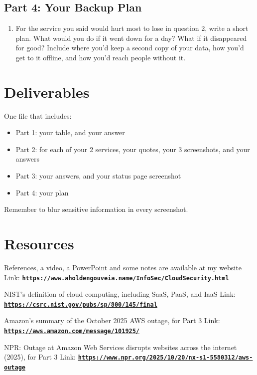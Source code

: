 \documentclass[12pt]{article}
\begin{document}
\subsection*{Part 4: Your Backup Plan}
\begin{enumerate}[start=13]
    \item For the service you said would hurt most to lose in question 2, write a short plan. What would you do if it went down for a day? What if it disappeared for good? Include where you'd keep a second copy of your data, how you'd get to it offline, and how you'd reach people without it.
\end{enumerate}

\section*{Deliverables}
One file that includes:
\begin{itemize}
    \item Part 1: your table, and your answer
    \item Part 2: for each of your 2 services, your quotes, your 3 screenshots, and your answers
    \item Part 3: your answers, and your status page screenshot
    \item Part 4: your plan
\end{itemize}
Remember to blur sensitive information in every screenshot.

\section*{Resources}
References, a video, a PowerPoint and some notes are available at my website
Link: \href{https://www.aholdengouveia.name/InfoSec/CloudSecurity.html}{\textbf{\nolinkurl{https://www.aholdengouveia.name/InfoSec/CloudSecurity.html}}}

NIST's definition of cloud computing, including SaaS, PaaS, and IaaS
Link: \href{https://csrc.nist.gov/pubs/sp/800/145/final}{\textbf{\nolinkurl{https://csrc.nist.gov/pubs/sp/800/145/final}}}

Amazon's summary of the October 2025 AWS outage, for Part 3
Link: \href{https://aws.amazon.com/message/101925/}{\textbf{\nolinkurl{https://aws.amazon.com/message/101925/}}}

NPR: Outage at Amazon Web Services disrupts websites across the internet (2025), for Part 3
Link: \href{https://www.npr.org/2025/10/20/nx-s1-5580312/aws-outage}{\textbf{\nolinkurl{https://www.npr.org/2025/10/20/nx-s1-5580312/aws-outage}}}
\end{document}

